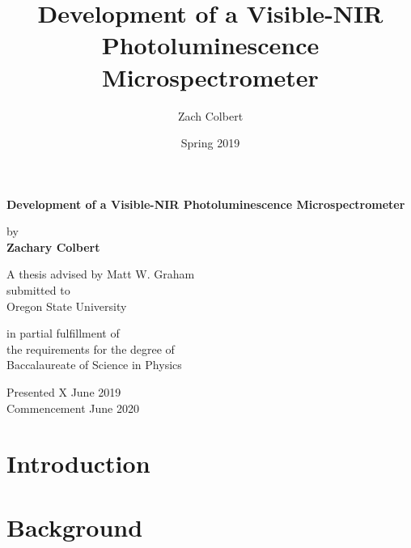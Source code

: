 \documentclass{report}
\title{Development of a Visible-NIR Photoluminescence Microspectrometer}
\author{Zach Colbert}
\date{Spring 2019}
\renewenvironment{abstract}
 {%
  \global\setbox\abstractbox=\vtop\bgroup
  \begin{center}\bfseries\abstractname\end{center}%
 }
 {\par\egroup}
\begin{document}

  \begin{titlepage}
    \begin{center}
        \vspace*{1cm}
  
        \textbf{Development of a Visible-NIR Photoluminescence Microspectrometer}
  
        \vspace{1.5cm}
  
        by \\
        \textbf{Zachary Colbert}
  
        \vspace{5cm}
  
        A thesis advised by Matt W. Graham \\
        submitted to \\
        Oregon State University

        \vspace{1.5cm}

        in partial fulfillment of \\
        the requirements for the degree of \\
        Baccalaureate of Science in Physics
  
        \vfill
  
        Presented X June 2019 \\
        Commencement June 2020
  
    \end{center}
  \end{titlepage}

  

  \tableofcontents


  \chapter{Introduction}
  

  \chapter{Background}
  
\end{document}
